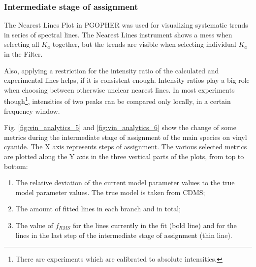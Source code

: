 \documentclass[11pt]{article}
\begin{document}


\subsubsection{Intermediate stage of assignment}

The Nearest Lines Plot in PGOPHER was used for visualizing systematic trends in series of spectral lines. The Nearest Lines instrument shows a mess when selecting all $K_a$ together, but the trends are visible when selecting individual $K_a$ in the Filter. 

Also, applying a restriction for the intensity ratio of the calculated and experimental lines helps, if it is consistent enough. Intensity ratios play a big role when choosing between otherwise unclear nearest lines. In most experiments though\footnote{There are experiments which are calibrated to absolute intensities.}, intensities of two peaks can be compared only locally, in a certain frequency window. 

Fig. \ref{fig:vin_analytics_5} and \ref{fig:vin_analytics_6} show the change of some metrics during the intermediate stage of assignment of the main species on vinyl cyanide. The X axis represents steps of assignment. The various selected metrics are plotted along the Y axis in the three vertical parts of the plots, from top to bottom: 
\begin{enumerate}
    \item The relative deviation of the current model parameter values to the true model parameter values. The true model is taken from CDMS; 
    \item The amount of fitted lines in each branch and in total;
    \item The value of $f_{RMS}$ for the lines currently in the fit (bold line) and for the lines in the last step of the intermediate stage of assignment (thin line).
\end{enumerate}
\end{document}
